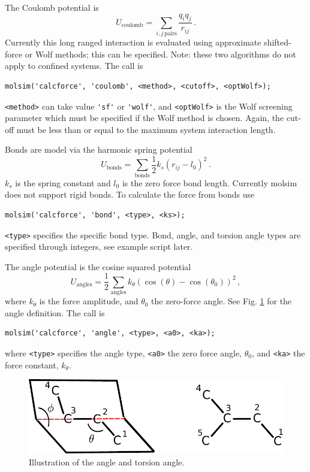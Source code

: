 \documentclass[11pt]{article}
\begin{document}
The Coulomb potential is 
\begin{equation}
  U_{\mathrm{coulomb}} = \sum_{i,j \, \mathrm{pairs}}\frac{q_iq_j}{r_{ij}} \, .
\end{equation}
Currently this long ranged interaction is evaluated using approximate
shifted-force or Wolf methods; this can be specified. Note: these two
algorithms do not apply to confined systems. The call is
\begin{verbatim}
molsim('calcforce', 'coulomb', <method>, <cutoff>, <optWolf>);
\end{verbatim}
\verb!<method>! can take value \verb!'sf'! or \verb!'wolf'!, and
\verb!<optWolf>! is the Wolf screening parameter which must be specified if the
Wolf method is chosen. Again, the cut-off must be less than or equal to the
maximum system interaction length.

Bonds are model via the harmonic spring potential
\begin{equation}
  U_{\mathrm{bonds}} =\sum_{\mathrm{bonds}} \frac{1}{2} k_{s}(r_{ij} - l_0)^2 \, .
\end{equation}
$k_s$ is the spring constant and $l_0$ is the zero force bond length. 
Currently \textsf{molsim} does not support rigid bonds. To calculate the force
from bonds use
\begin{verbatim}
molsim('calcforce', 'bond', <type>, <ks>);
\end{verbatim} 
\verb!<type>! specifies the specific bond type. Bond, angle, and torsion angle
types are specified through integers, see example script later. 

The angle potential is the cosine squared potential
\begin{equation}
  U_{\mathrm{angles}}=\frac{1}{2}\sum_{\mathrm{angles}} k_{\theta} (\cos(\theta) - \cos(\theta_0))^2 \, ,
\end{equation}
where $k_\theta$ is the force amplitude, and $\theta_0$ the zero-force
angle. See Fig. \ref{fig:torsion} for the angle definition. The call is
\begin{verbatim}
molsim('calcforce', 'angle', <type>, <a0>, <ka>);
\end{verbatim}
where \verb!<type>! specifies the angle type, \verb!<a0>! the zero force angle,
$\theta_0$, and \verb!<ka>! the force constant, $k_\theta$.  
\begin{figure}[h]
  \begin{center}
    \includegraphics[scale=.7]{diheadral.pdf}
  \caption{
    \label{fig:torsion}
    Illustration of the angle and torsion angle.
  }
  \end{center}
\end{figure}
\end{document}
